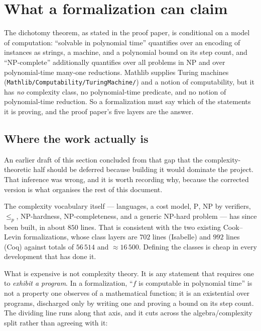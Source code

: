\section{What a formalization can claim}\label{sec:bp-targets}

The dichotomy theorem, as stated in the proof paper, is conditional on a model
of computation: ``solvable in polynomial time'' quantifies over an encoding of
instances as strings, a machine, and a polynomial bound on its step count, and
``\textup{NP}-complete'' additionally quantifies over all problems in
\textup{NP} and over polynomial-time many-one reductions. Mathlib supplies
Turing machines (\texttt{Mathlib/Computability/TuringMachine/}) and a notion of
computability, but it has \emph{no} complexity class, no polynomial-time
predicate, and no notion of polynomial-time reduction. So a formalization must
say which of the statements it is proving, and the proof paper's five layers
are the answer.

\subsection{Where the work actually is}\label{sec:program-axis}

An earlier draft of this section concluded from that gap that the
complexity-theoretic half should be deferred because building it would dominate
the project. That inference was wrong, and it is worth recording why, because
the corrected version is what organises the rest of this document.

The complexity vocabulary itself --- languages, a cost model, $\mathrm P$,
$\mathrm{NP}$ by verifiers, $\le_{p}$, \textup{NP}-hardness,
\textup{NP}-completeness, and a generic \textup{NP}-hard problem --- has since
been built, in about $850$ lines. That is consistent with the two existing
Cook--Levin formalizations, whose class layers are $702$ lines (Isabelle) and
$992$ lines (Coq) against totals of $56\,514$ and $\approx 16\,500$. Defining
the classes is cheap in every development that has done it.

What is expensive is not complexity theory. It is any statement that requires
one to \emph{exhibit a program}. In a formalization, ``$f$ is computable in
polynomial time'' is not a property one observes of a mathematical function; it
is an existential over programs, discharged only by writing one and proving a
bound on its step count. The dividing line runs along that axis, and it cuts
across the algebra/complexity split rather than agreeing with it:

